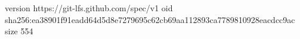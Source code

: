version https://git-lfs.github.com/spec/v1
oid sha256:ea38901f91eadd64d5d8e7279695c62cb69aa112893ca7789810928eacdcc9ac
size 554
